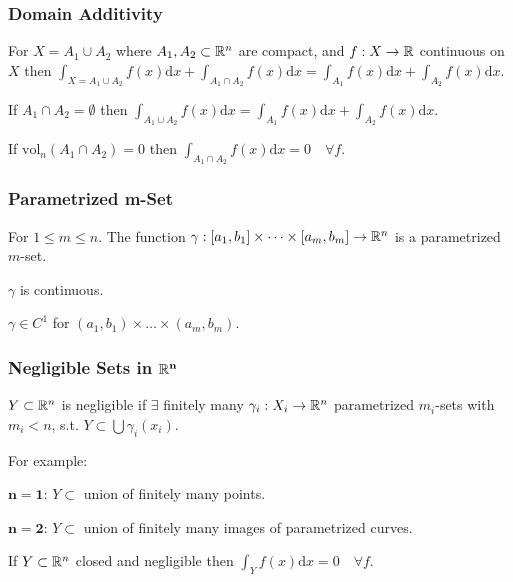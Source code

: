 \subsubsection{Domain Additivity}
For $X = A_1 \cup A_2$ where $A_1, A_2 \subset \mathbb{R}^n$ are compact, and $f: X \to \mathbb{R}$ continuous on $X$ then $\int_{X = A_1 \cup A_2} f(x) \mathrm{d}x + \int_{A_1 \cap A_2} f(x) \mathrm{d}x = \int_{A_1} f(x) \mathrm{d}x + \int_{A_2} f(x) \mathrm{d}x$.

\begin{compactitem}
    \item If $A_1 \cap A_2 = \emptyset$ then $\int_{A_1 \cup A_2} f(x) \mathrm{d}x = \int_{A_1} f(x) \mathrm{d}x + \int_{A_2} f(x) \mathrm{d}x$.
    \item If $\text{vol}_n(A_1 \cap A_2) = 0$ then $\int_{A_1 \cap A_2} f(x) \mathrm{d}x = 0 \quad \forall f$.
\end{compactitem}

\subsubsection{Parametrized m-Set}
For $1 \le m \le n$. The function $\gamma: [a_1, b_1] \times \dots \times [a_m, b_m] \to \mathbb{R}^n$ is a parametrized $m$-set.

\begin{compactitem}
    \item $\gamma$ is continuous.
    \item $\gamma \in C^1$ for $(a_1, b_1) \times \dots \times (a_m, b_m)$.
\end{compactitem}

\subsubsection{Negligible Sets in $\mathbf{\mathbb{R}^n}$}
$Y \subset \mathbb{R}^n$ is negligible if $\exists$ finitely many $\gamma_i: X_i \to \mathbb{R}^n$ parametrized $m_i$-sets with $m_i < n$, s.t. $Y \subset \bigcup \gamma_i(x_i)$.

For example:
\begin{compactdesc}
    \item[$\mathbf{n = 1}$:] $Y \subset$ union of finitely many points.
    \item[$\mathbf{n = 2}$:] $Y \subset$ union of finitely many images of parametrized curves.
\end{compactdesc}

If $Y \subset \mathbb{R}^n$ closed and negligible then $\int_{Y} f(x) \mathrm{d}x = 0 \quad \forall f$.

